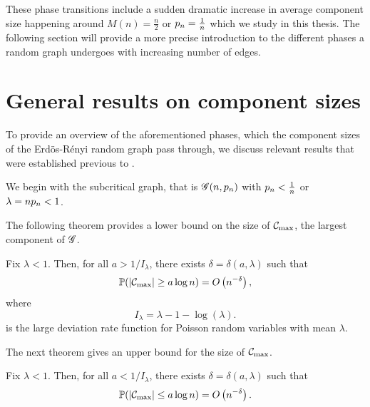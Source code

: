 These phase transitions include a sudden dramatic increase in average component size happening around $M(n) = \frac{n}{2}$ or $p_n = \frac{1}{n}$
which we study in this thesis.
The following section will provide a more precise introduction to the different phases a random graph undergoes
with increasing number of edges.


\section{General results on component sizes}

To provide an overview of the aforementioned phases, 
which the component sizes of the Erdös-Rényi random graph pass through,
we discuss relevant results that were established previous to \cite{Aldous.1997}.

We begin with the subcritical graph, that is
$\mathscr{G}(n, p_n)$ with $p_n < \frac{1}{n}$
or $\lambda = n p_n < 1$.

The following theorem provides a lower bound on the size of $\mathcal{C}_{\max}$, the largest component of $\mathscr{G}$.
\begin{theorem}
	Fix $\lambda < 1$. 
	Then, for all $a > 1/I_{\lambda}$, 
	there exists $\delta = \delta(a, \lambda)$ such that
	\begin{equation}
		\mathbb{P}( |\mathcal{C}_{\max}| \geq a \log n ) = O\left(n^{-\delta}\right),
	\end{equation}
	where 
	\begin{equation}
		I_{\lambda} = \lambda - 1 - \log(\lambda).
	\end{equation}
	is the large deviation rate function for Poisson random variables with mean $\lambda$.
\end{theorem}

The next theorem gives an upper bound for the size of $\mathcal{C}_{\max}$.
\begin{theorem}
	Fix $\lambda < 1$. 
	Then, for all $a < 1/I_{\lambda}$, 
	there exists $\delta = \delta(a, \lambda)$ such that
	\begin{equation}
	\mathbb{P}( |\mathcal{C}_{\max}| \leq a \log n ) = O\left(n^{-\delta}\right).
	\end{equation}
\end{theorem}

